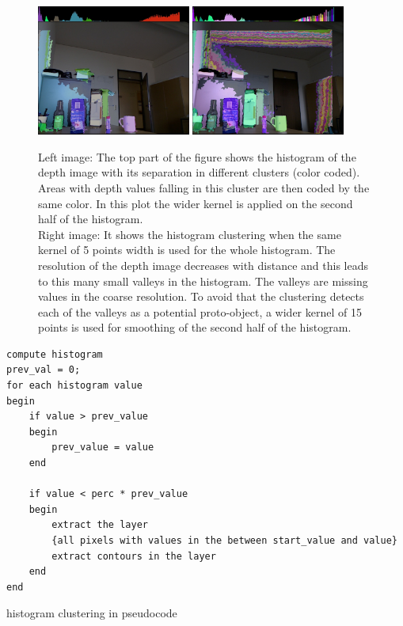 \begin{figure}[ht]
    \centering
        \includegraphics[width=0.45\textwidth]{images/cluster_bli_erode.jpg}
        \hspace{0.1cm}                      
        \includegraphics[width=0.45\textwidth]{images/histo_equal_smooth.jpg}        
    \caption{Left image: The top part of the figure shows the histogram of the depth image with its separation in different clusters (color coded). Areas with depth values falling in this cluster are then coded by the same color. In this plot the wider kernel is applied on the second half of the histogram.\\
    Right image: It shows the histogram clustering when the same kernel of 5 points width is used for the whole histogram. The resolution of the depth image decreases with distance and this leads to this many small valleys in the histogram. The valleys are missing values in the coarse resolution. To avoid that the clustering detects each of the valleys as a potential proto-object, a wider kernel of 15 points is used for smoothing of the second half of the histogram.}
    \label{sg:fig:images_cluster_bli_erode}
\end{figure}

\clearpage
\begin{listing}
    \lstset{ language=Pascal, numbers=left, numberstyle=\footnotesize, 
        stepnumber=5, numbersep=5pt}
    
    \begin{lstlisting}[frame=single]
compute histogram
prev_val = 0;
for each histogram value
begin
    if value > prev_value
    begin
        prev_value = value
    end
    
    if value < perc * prev_value
    begin
        extract the layer
        {all pixels with values in the between start_value and value}
        extract contours in the layer
    end
end
    \end{lstlisting}
    \caption{histogram clustering in pseudocode}
    \label{lst:clustering}
\end{listing}

